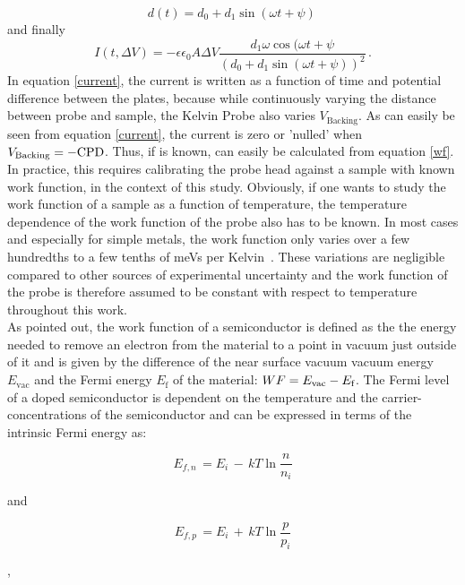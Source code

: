 \begin{equation}
	d(t) = d_0 + d_1 \sin (\omega t + \psi)\, 
\end{equation}
and finally
\begin{equation}
\label{current}
	I(t,\Delta V) = -\epsilon \epsilon _0 A \Delta V \frac{d_1 \omega \cos (\omega t + \psi}{(d_0 + d_1 \sin (\omega t + \psi))^2}\, .
\end{equation}
In equation \eqref{current}, the current is written as a function of time and potential difference between the plates, because while continuously varying the distance between probe and sample, the Kelvin Probe also varies $V_{\text{Backing}}$. As can easily be seen from equation \eqref{current}, the current is zero or 'nulled' when $V_{\text{Backing}}=-\text{CPD}$. Thus, if \wfp{} is known, \wfs{} can easily be calculated from equation \eqref{wf}. In practice, this requires calibrating the probe head against a sample with known work function, \hopg{} in the context of this study. Obviously, if one wants to study the work function of a sample as a function of temperature, the temperature dependence of the work function of the probe also has to be known. In most cases and especially for simple metals, the work function only varies over a few hundredths to a few tenths of meVs per Kelvin~\cite{tempdepmet,tempdepmet2,tempdepmet3,tempdepmet4,tempdepmet5}. These variations are negligible compared to other sources of experimental uncertainty and the work function of the probe is therefore assumed to be constant with respect to temperature throughout this work.\\
As pointed out, the work function \wf{} of a semiconductor is defined as the the energy needed to remove an electron from the material to a point in vacuum just outside of it and is given by the difference of the near surface vacuum vacuum energy $E_{\text{vac}}$ and the Fermi energy $E_{\text{f}}$ of the material: $WF = E_{\text{vac}} - E_{\text{f}}$. The Fermi level of a doped semiconductor is dependent on the temperature and the carrier-concentrations of the semiconductor and can be expressed in terms of the intrinsic Fermi energy as:\\[5pt]
\begin{minipage}[c]{0.4\textwidth}
	\begin{equation}
	\label{efn}
	E_{f,n} \, =  E_i \, - \, kT \ln{\frac{n}{n_i}}
	\end{equation}
\end{minipage}	
\hfill
and
\hfill
\begin{minipage}[c]{0.4\textwidth}
	\begin{equation}
	\label{efp}
	E_{f,p} \, = E_i \, + \, kT \ln{\frac{p}{p_i}}
	\end{equation}
\end{minipage},\\[5pt]
